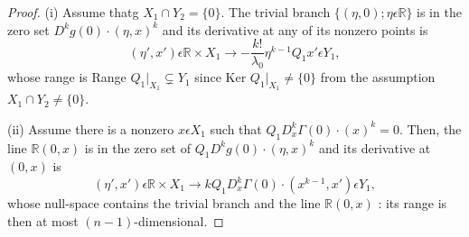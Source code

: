 \begin{proof}
(i) Assume thatg $X_{1} \cap Y_{2} = \{0\}$. The trivial branch
  $\{(\eta, 0); \eta \epsilon \mathbb{R}\}$ is in the zero set
  $D^{k}g(0) \cdot (\eta, x)^{k}$ and its derivative at any of its
  nonzero points is
$$
(\eta', x') \epsilon \mathbb{R} \times X_{1} \to -
  \frac{k!}{\lambda_{0}} \eta^{k-1} Q_{1} x' \epsilon Y_{1},
$$
whose range is Range $Q_{1} |_{X_{1}} \subsetneq Y_{1}$ since Ker
$Q_{1} |_{X_{1}} \neq \{0\}$ from the assumption\pageoriginale $X_{1}
\cap Y_{2} \neq \{0\}$.

(ii) Assume there is a nonzero $x \epsilon X_{1}$ such that
$Q_{1}D_{x}^{k}\Gamma(0) \cdot (x)^{k} = 0$. Then, the line
$\mathbb{R}(0, x)$ is in the zero set of $Q_{1}D^{k}g(0) \cdot (\eta,
x)^{k}$ and its derivative at $(0, x)$ is 
$$
(\eta', x') \epsilon \mathbb{R} \times X_{1} \to
kQ_{1}D_{x}^{k}\Gamma(0) \cdot (x^{k-1}, x') \epsilon Y_{1},
$$
whose null-space contains the trivial branch and the line
$\mathbb{R}(0, x)$ : its range is then at most $(n-1)$-dimensional.
\end{proof}


